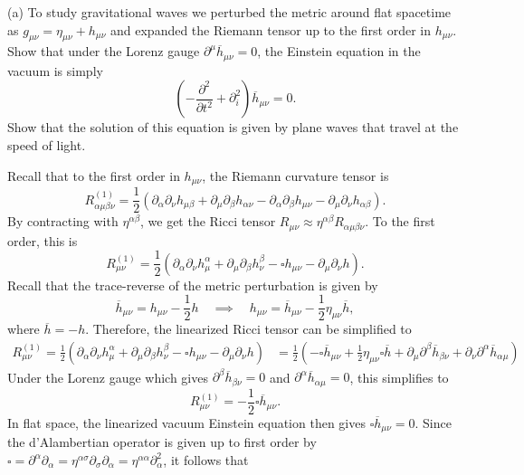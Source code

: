 \documentclass{../../templates/lkx_pset}
\begin{document}
\begin{parts}
  \begin{part}{(a)}
    To study gravitational waves we perturbed the metric around flat spacetime as $g_{\mu\nu} = \eta_{\mu\nu} + h_{\mu\nu}$ and expanded the Riemann tensor up to the first order in $h_{\mu\nu}$. Show that under the Lorenz gauge $\partial^\mu \overline{h}_{\mu\nu}=0$, the Einstein equation in the vacuum is simply
    \[
      \left(-\frac{\partial^2}{\partial t^2} + \partial_i^2\right)\overline{h}_{\mu\nu} = 0.
    \]
    Show that the solution of this equation is given by plane waves that travel at the speed of light.
  \end{part}

  Recall that to the first order in $h_{\mu\nu}$, the Riemann curvature tensor is
  \[
    R_{\alpha\mu\beta\nu}^{(1)} = \frac{1}{2}(\partial_\alpha \partial_\nu h_{\mu\beta} + \partial_\mu \partial_\beta h_{\alpha\nu} - \partial_\alpha \partial_\beta h_{\mu\nu} - \partial_\mu\partial_\nu h_{\alpha\beta}).
  \]
  By contracting with $\eta^{\alpha\beta}$, we get the Ricci tensor $R_{\mu\nu}\approx \eta^{\alpha\beta}R_{\alpha\mu\beta\nu}$. To the first order, this is
  \[
    R^{(1)}_{\mu\nu}= \frac{1}{2}(\partial_\alpha\partial_\nu h^{\alpha}_\mu + \partial_\mu\partial_\beta h^\beta_\nu - \square h_{\mu\nu} - \partial_\mu\partial_\nu h).
  \]
  Recall that the trace-reverse of the metric perturbation is given by \[\overline{h}_{\mu\nu} = h_{\mu\nu}-\frac{1}{2}h\quad\implies\quad h_{\mu\nu} = \overline{h}_{\mu\nu} - \frac{1}{2}\eta_{\mu\nu} \overline{h},\]
  where $\overline{h} = -h$.
  Therefore, the linearized Ricci tensor can be simplified to
  \[
    \begin{aligned}
    R^{(1)}_{\mu\nu}= \frac{1}{2}(\partial_\alpha\partial_\nu h^{\alpha}_\mu + \partial_\mu\partial_\beta h^\beta_\nu - \square h_{\mu\nu} - \partial_\mu\partial_\nu h) 
    &= \frac{1}{2}\left(-\square\overline{h}_{\mu\nu} +\frac{1}{2} \eta_{\mu\nu}\square \overline{h} + \partial_\mu \partial^\beta \overline{h}_{\beta\nu} + \partial_\nu \partial^\alpha\overline{h}_{\alpha\mu}\right)
  \end{aligned}
  \]
  Under the Lorenz gauge which gives $\partial^\beta \overline{h}_{\beta\nu}=0$ and $\partial^\alpha \overline{h}_{\alpha\mu}=0$, this simplifies to
  \[
    R_{\mu\nu}^{(1)} = -\frac{1}{2}\square \overline{h}_{\mu\nu}.
  \]
  In flat space, the linearized vacuum Einstein equation then gives $\square\overline{h}_{\mu\nu}=0$. Since the d'Alambertian operator is given up to first order by $\square = \partial^\alpha\partial_\alpha = \eta^{\alpha\sigma}\partial_\sigma\partial_\alpha = \eta^{\alpha\alpha}\partial_\alpha^2$, it follows that

\end{parts}
\end{document}
